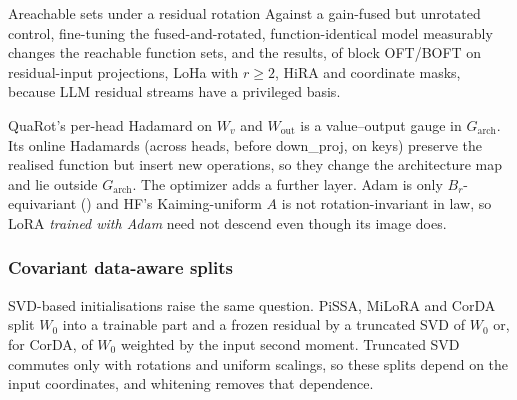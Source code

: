 \begin{conjecture}{A}{reachable sets under a residual rotation}
Against a gain-fused but unrotated control, fine-tuning the fused-and-rotated, function-identical model measurably
changes the reachable function sets, and the results, of block OFT/BOFT on residual-input projections, LoHa with
$r\ge2$, HiRA and coordinate masks, because LLM residual streams have a privileged basis.
\end{conjecture}

QuaRot's per-head Hadamard on $W_v$ and $W_{\mathrm{out}}$ is a value--output gauge in $G_{\mathrm{arch}}$. Its online
Hadamards (across heads, before down\_proj, on keys) preserve the realised function but insert new operations, so they
change the architecture map and lie outside $G_{\mathrm{arch}}$. The optimizer adds a further layer. Adam is only
$B_r$-equivariant () and HF's Kaiming-uniform $A$ is not rotation-invariant in law, so LoRA
\emph{trained with Adam} need not descend even though its image does.

\subsubsection{Covariant data-aware splits}\label{sec:cut-splits}

SVD-based initialisations raise the same question. PiSSA, MiLoRA and CorDA split $W_0$ into a trainable part and a
frozen residual by a truncated SVD of $W_0$ or, for CorDA, of $W_0$ weighted by the input second moment. Truncated SVD
commutes only with rotations and uniform scalings, so these splits depend on the input coordinates, and whitening
removes that dependence.

